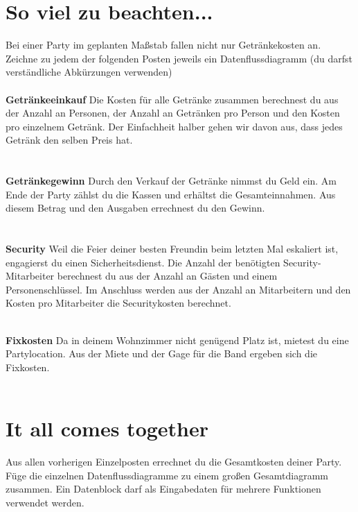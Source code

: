     \section{So viel zu beachten...}
    Bei einer Party im geplanten Maßstab fallen nicht nur Getränkekosten an. Zeichne zu jedem der folgenden Posten jeweils ein Datenflussdiagramm (du darfst verständliche Abkürzungen verwenden)\\\\
    
    \large\textbf{Getränkeeinkauf} \normalsize \hspace{0.2cm}
    Die Kosten für alle Getränke zusammen berechnest du aus der Anzahl an Personen, der Anzahl an Getränken pro Person und den Kosten pro einzelnem Getränk. Der Einfachheit halber gehen wir davon aus, dass jedes Getränk den selben Preis hat.\\
    \\\\
    
    \large\textbf{Getränkegewinn} \normalsize \hspace{0.2cm}
    Durch den Verkauf der Getränke nimmst du Geld ein. Am Ende der Party zählst du die Kassen und erhältst die Gesamteinnahmen. Aus diesem Betrag und den Ausgaben errechnest du den Gewinn.\\
    \\\\
    
    \large\textbf{Security} \normalsize \hspace{0.2cm}
    Weil die Feier deiner besten Freundin beim letzten Mal eskaliert ist, engagierst du einen Sicherheitsdienst. Die Anzahl der benötigten Security-Mitarbeiter berechnest du aus der Anzahl an Gästen und einem Personenschlüssel. Im Anschluss werden aus der Anzahl an Mitarbeitern und den Kosten pro Mitarbeiter die Securitykosten berechnet.\\
    \\
    
    \newpage
    
    \large\textbf{Fixkosten} \normalsize \hspace{0.2cm}
    Da in deinem Wohnzimmer nicht genügend Platz ist, mietest du eine Partylocation. Aus der Miete und der Gage für die Band ergeben sich die Fixkosten.\\
    \\
    
    \section{It all comes together}
    Aus allen vorherigen Einzelposten errechnet du die Gesamtkosten deiner Party. Füge die einzelnen Datenflussdiagramme zu einem großen Gesamtdiagramm zusammen. Ein Datenblock darf als Eingabedaten für mehrere Funktionen verwendet werden.\\
